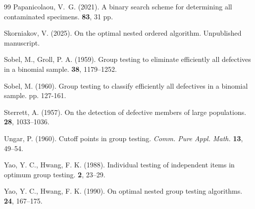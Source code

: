 \documentclass[12pt]{article}
\begin{document}
\begin{thebibliography}{99}
Papanicolaou, V.~G. (2021).
\newblock A binary search scheme for determining all contaminated specimens.
 {\textbf{83},} 31 pp.


Skorniakov, V. (2025).
\newblock On the optimal nested ordered algorithm.
\newblock Unpublished manuscript.


Sobel, M., Groll, P. A. (1959).
\newblock Group testing to eliminate efficiently all defectives in a binomial sample.
 {\textbf{ 38},} 1179--1252.

Sobel, M. (1960).
\newblock Group testing to classify efficiently all defectives in a binomial sample.
 pp. 127-161.





Sterrett, A. (1957).
\newblock On the detection of defective members of large populations.
 {\textbf{ 28},} 1033--1036.


Ungar, P. (1960). Cutoff points in group testing.
{\it Comm. Pure Appl. Math.} {\textbf {13},} 49--54.




Yao, Y. C., Hwang, F. K. (1988).
\newblock  Individual testing of independent items in optimum group testing.
 {\textbf{2},} 23--29.



Yao, Y. C., Hwang, F. K. (1990).
\newblock  On optimal nested group testing algorithms.
 {\textbf{24},} 167--175.

\end{thebibliography}{}
\end{document}
